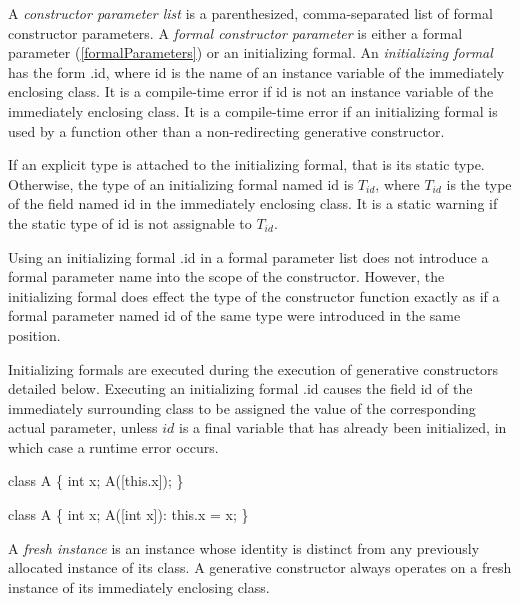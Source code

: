 \documentclass{article}
\newcommand{\code}[1]{{\sf #1}}
\begin{document}
\LMHash{}
A {\em constructor parameter list} is a parenthesized, comma-separated list of formal constructor parameters. A {\em formal constructor parameter} is either a formal parameter (\ref{formalParameters}) or an initializing formal. An {\em initializing formal} has the form \code{\THIS{}.id}, where \code{id} is the name of an instance variable of the immediately enclosing class.  It is a compile-time error if \code{id} is not an instance variable of the immediately enclosing class. It is a compile-time error if an initializing formal is used by a function other than a non-redirecting generative constructor. 

\LMHash{}
If an explicit type is attached to the initializing formal, that is its static type. Otherwise, the type of an initializing formal named \code{id} is $T_{id}$, where $T_{id}$ is the type of the field named \code{id} in the immediately enclosing class. It is a static warning if the static type of \code{id} is not assignable to $T_{id}$.

\LMHash{}
Using an initializing formal \code{\THIS{}.id} in a formal parameter list does not introduce a formal parameter name into the scope of the constructor. However, the initializing formal does effect the type of the constructor function exactly as if a formal parameter  named \code{id}  of the same type were introduced in the same position.

\LMHash{}
Initializing formals are executed during the execution of generative constructors detailed below. Executing an initializing formal  \code{\THIS{}.id} causes the field \code{id} of the immediately surrounding class to be assigned the value of the corresponding actual parameter, unless $id$ is a final variable that has already been initialized, in which case a runtime error occurs.



\begin{dartCode}
class A \{
  int x;
  A([this.x]);
\}
\end{dartCode}


\begin{dartCode}
class A \{ 
  int x;
  A([int x]): this.x = x;
\}
\end{dartCode}

\LMHash{}
A {\em fresh instance} is an instance whose identity  is distinct from any previously allocated instance of its class. A generative constructor always operates on a fresh instance of its immediately enclosing class. 
\end{document}

